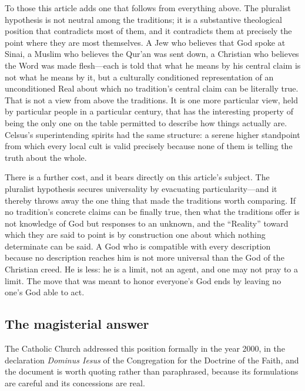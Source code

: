 To those this article adds one that follows from everything above. The pluralist hypothesis is not neutral among the traditions; it is a substantive theological position that contradicts most of them, and it contradicts them at precisely the point where they are most themselves. A Jew who believes that God spoke at Sinai, a Muslim who believes the Qur'an was sent down, a Christian who believes the Word was made flesh---each is told that what he means by his central claim is not what he means by it, but a culturally conditioned representation of an unconditioned Real about which no tradition's central claim can be literally true. That is not a view from above the traditions. It is one more particular view, held by particular people in a particular century, that has the interesting property of being the only one on the table permitted to describe how things actually are. Celsus's superintending spirits had the same structure: a serene higher standpoint from which every local cult is valid precisely because none of them is telling the truth about the whole.

There is a further cost, and it bears directly on this article's subject. The pluralist hypothesis secures universality by evacuating particularity---and it thereby throws away the one thing that made the traditions worth comparing. If no tradition's concrete claims can be finally true, then what the traditions offer is not knowledge of God but responses to an unknown, and the ``Reality'' toward which they are said to point is by construction one about which nothing determinate can be said. A God who is compatible with every description because no description reaches him is not more universal than the God of the Christian creed. He is less: he is a limit, not an agent, and one may not pray to a limit. The move that was meant to honor everyone's God ends by leaving no one's God able to act.

\subsection{The magisterial answer}

The Catholic Church addressed this position formally in the year 2000, in the declaration \emph{Dominus Iesus} of the Congregation for the Doctrine of the Faith, and the document is worth quoting rather than paraphrased, because its formulations are careful and its concessions are real.

